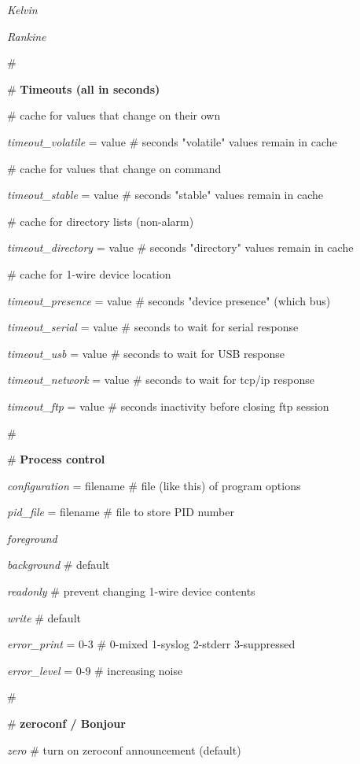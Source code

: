 \begin{description}
\textit{Kelvin} 

\textit{Rankine} 

\# 

\# \textbf{Timeouts (all in seconds)} 

\#                    cache for values that change on their own 

\textit{timeout\_volatile} = value \# seconds "volatile" values remain in cache 

\#                    cache for values that change on command 

\textit{timeout\_stable} = value \# seconds "stable" values remain in cache 

\#                    cache for directory lists (non-alarm) 

\textit{timeout\_directory} = value \# seconds "directory" values remain in cache


\#                    cache for 1-wire device location 

\textit{timeout\_presence} = value \# seconds "device presence" (which bus) 

\textit{timeout\_serial} = value \# seconds to wait for serial response 

\textit{timeout\_usb} = value \# seconds to wait for USB response 

\textit{timeout\_network} = value \# seconds to wait for tcp/ip response 

\textit{timeout\_ftp} = value \# seconds inactivity before closing ftp session 

\# 

\# \textbf{Process control} 

\textit{configuration} = filename \# file (like this) of program options 

\textit{pid\_file} = filename \# file to store PID number 

\textit{foreground} 

\textit{background} \# default 

\textit{readonly} \# prevent changing 1-wire device contents 

\textit{write} \# default 

\textit{error\_print} = 0-3 \# 0-mixed 1-syslog 2-stderr 3-suppressed 

\textit{error\_level} = 0-9 \# increasing noise 

\# 

\# \textbf{zeroconf / Bonjour} 

\textit{zero} \#   turn on zeroconf announcement (default) 


\end{description}
